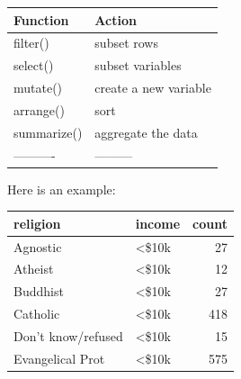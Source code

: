 \documentclass[
  letterpaper,
  DIV=11,
  numbers=noendperiod]{scrreprt}
\newenvironment{Shaded}{\begin{snugshade}}{\end{snugshade}}
\newcommand{\AttributeTok}[1]{\textcolor[rgb]{0.40,0.45,0.13}{#1}}
\newcommand{\CommentTok}[1]{\textcolor[rgb]{0.37,0.37,0.37}{#1}}
\newcommand{\FunctionTok}[1]{\textcolor[rgb]{0.28,0.35,0.67}{#1}}
\newcommand{\NormalTok}[1]{\textcolor[rgb]{0.00,0.23,0.31}{#1}}
\newcommand{\OtherTok}[1]{\textcolor[rgb]{0.00,0.23,0.31}{#1}}
\newcommand{\SpecialCharTok}[1]{\textcolor[rgb]{0.37,0.37,0.37}{#1}}
\newcommand{\StringTok}[1]{\textcolor[rgb]{0.13,0.47,0.30}{#1}}
\begin{document}
\begin{longtable}[]{@{}ll@{}}
\toprule\noalign{}
Function & Action \\
\midrule\noalign{}
\endhead
\bottomrule\noalign{}
\endlastfoot
filter() & subset rows \\
select() & subset variables \\
mutate() & create a new variable \\
arrange() & sort \\
summarize() & aggregate the data \\
---------- & --------- \\
\end{longtable}

Here is an example:

\begin{Shaded}
\end{Shaded}

\begin{longtable}[]{@{}llr@{}}
\toprule\noalign{}
religion & income & count \\
\midrule\noalign{}
\endhead
\bottomrule\noalign{}
\endlastfoot
Agnostic & \textless\$10k & 27 \\
Atheist & \textless\$10k & 12 \\
Buddhist & \textless\$10k & 27 \\
Catholic & \textless\$10k & 418 \\
Don't know/refused & \textless\$10k & 15 \\
Evangelical Prot & \textless\$10k & 575 \\
\end{longtable}

\begin{Shaded}
\end{Shaded}
\end{document}
